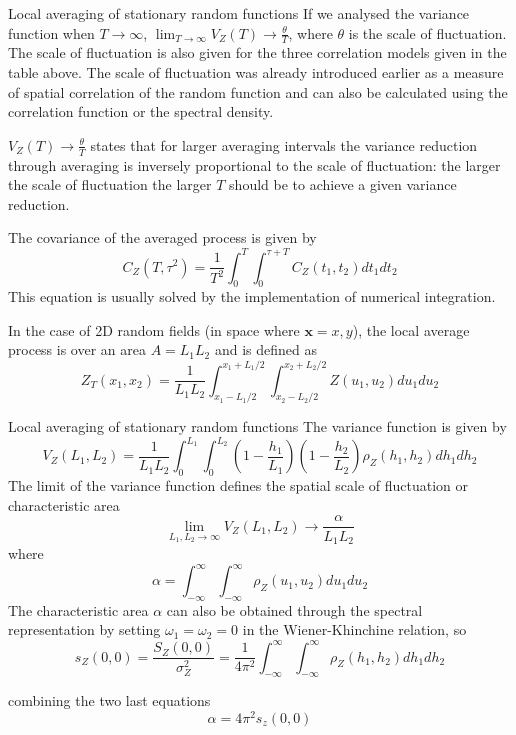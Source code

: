 \documentclass[8pt]{beamer}
\renewcommand{\emph}[1]{\textcolor{myorange}{#1}}
\begin{document}
\begin{frame}{Local averaging of stationary random functions}
    If we analysed the \emph{variance function} when $T \rightarrow \infty$, $\lim_{T\rightarrow \infty} V_Z (T) \rightarrow \frac{\theta}{T}$, where $\theta$ is the \alert{scale of fluctuation}. The \emph{scale of fluctuation} is also given for the three correlation models given in the table above. The \emph{scale of fluctuation} was already introduced earlier as a measure of \emph{spatial correlation} of the \emph{random function} and can also be calculated using the \emph{correlation function } or the \emph{spectral density}. 

    $V_Z (T) \rightarrow \frac{\theta}{T}$ states that for larger averaging intervals the variance reduction through averaging is inversely proportional to the \emph{scale of fluctuation}: the larger the \emph{scale of fluctuation} the larger $T$ should be to achieve a given variance reduction.

    The \emph{covariance} of the averaged  process is given by
    \[
        C_Z (T, \tau^2) =\frac{1}{T^2} \int_0^{T} \int_0^{\tau + T} C_Z (t_1, t_2) dt_1 dt_2
    \]
    This equation is usually solved by the implementation of \emph{numerical integration}. 

    In the case of \emph{2D random fields} (in space where $\mathbf{x} = {x,y}$), the local average process is over an area $A=L_1 L_2$ and is defined as
    \[
        Z_T (x_1, x_2) =\frac{1}{L_1 L_2} \int_{x_1 - L_1/2 }^{x_1 + L_1/2} \int_{x_2 - L_2/2 }^{x_2 + L_2/2} Z(u_1, u_2) du_1 du_2
    \]
     
\end{frame}

\begin{frame}{Local averaging of stationary random functions}
    The \emph{variance function} is given by
    \[
        V_Z (L_1, L_2) =\frac{1}{L_1 L_2} \int_{0}^{L_1} \int_{0}^{ L_2} \left(1- \frac{h_1}{L_1} \right) \left(1- \frac{h_2}{L_2} \right) \rho_Z (h_1, h_2) dh_1 dh_2
    \]
    The limit of the \emph{variance function} defines the spatial \alert{scale of fluctuation} or \alert{characteristic area}
    \[
        \lim_{L_1, L_2 \rightarrow \infty} V_Z (L_1, L_2) \rightarrow \frac{\alpha}{L_1 L_2}
    \]
    where
    \[
        \alpha = \int_{-\infty}^{\infty} \int_{-\infty}^{\infty} \rho_Z (u_1, u_2) du_1 du_2
    \]
    The \emph{characteristic area $\alpha$} can also be obtained through the spectral representation  by setting $\omega_1 = \omega_2 = 0$ in the \emph{Wiener-Khinchine relation}, so
    \[
        s_Z (0,0) = \frac{S_Z (0,0)}{\sigma_Z^2} = \frac{1}{4\pi^2}\int_{-\infty}^{\infty} \int_{-\infty}^{\infty}  \rho_Z (h_1, h_2) dh_1 dh_2
    \] 

    combining the two last equations
    \[
        \alpha = 4 \pi^2 s_z(0,0)
    \]

\end{frame}
\end{document}
